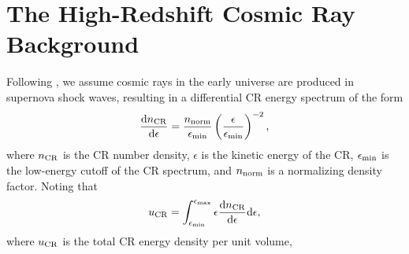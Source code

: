 
\section{The High-Redshift Cosmic Ray Background}
\label{crb}
Following \citet{StacyBromm2007}, we assume cosmic rays in the early universe are produced in supernova shock waves, resulting in a differential CR energy spectrum of the form
\begin{equation}
    \frac{{\rm d}n_{\rm \small CR}}{{\rm d}\epsilon} = \frac{n_{\rm norm}}{\epsilon_{\rm min}}
    \left( \frac{\epsilon}{\epsilon_{\rm min}} \right)^{-2},
\end{equation}
where $n_{\rm \small CR}$ is the CR number density, $\epsilon$ is the kinetic energy of the CR, $\epsilon_{\rm min}$ is the low-energy cutoff of the CR spectrum, and $n_{\rm norm}$ is a normalizing density factor.  Noting that 
\begin{equation}
u_{\rm \small CR} = \int_{\epsilon_{\rm min}}^{\epsilon_{\rm max}} \epsilon \frac{{\rm d}n_{\rm \small CR}}{{\rm d}\epsilon} {\rm d}\epsilon, 
\end{equation}
where $u_{\rm \small CR}$ is the total CR energy density per unit volume, 